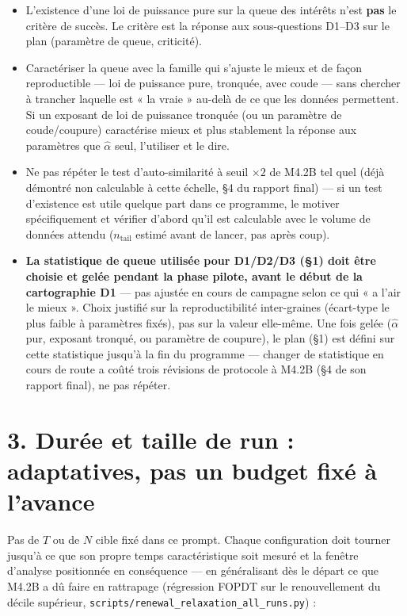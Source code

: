 \documentclass[11pt,a4paper]{article}
\newcommand{\code}[1]{\texttt{#1}}
\begin{document}
\begin{itemize}
\item L'existence d'une loi de puissance pure sur la queue des
  intérêts n'est \textbf{pas} le critère de succès. Le critère est la
  réponse aux sous-questions D1--D3 sur le plan (paramètre de queue,
  criticité).
\item Caractériser la queue avec la famille qui s'ajuste le mieux et
  de façon reproductible --- loi de puissance pure, tronquée, avec
  coude --- sans chercher à trancher laquelle est « la vraie »
  au-delà de ce que les données permettent. Si un exposant de loi de
  puissance tronquée (ou un paramètre de coude/coupure) caractérise
  mieux et plus stablement la réponse aux paramètres que $\hat\alpha$
  seul, l'utiliser et le dire.
\item Ne pas répéter le test d'auto-similarité à seuil $\times 2$ de
  M4.2B tel quel (déjà démontré non calculable à cette échelle, \S4 du
  rapport final) --- si un test d'existence est utile quelque part
  dans ce programme, le motiver spécifiquement et vérifier d'abord
  qu'il est calculable avec le volume de données attendu
  ($n_{\mathrm{tail}}$ estimé avant de lancer, pas après coup).
\item \textbf{La statistique de queue utilisée pour D1/D2/D3 (\S1)
  doit être choisie et gelée pendant la phase pilote, avant le début
  de la cartographie D1} --- pas ajustée en cours de campagne selon
  ce qui « a l'air le mieux ». Choix justifié sur la reproductibilité
  inter-graines (écart-type le plus faible à paramètres fixés), pas
  sur la valeur elle-même. Une fois gelée ($\hat\alpha$ pur, exposant
  tronqué, ou paramètre de coupure), le plan (\S1) est défini sur
  cette statistique jusqu'à la fin du programme --- changer de
  statistique en cours de route a coûté trois révisions de protocole
  à M4.2B (\S4 de son rapport final), ne pas répéter.
\end{itemize}

\section*{3. Durée et taille de run : adaptatives, pas un budget fixé à l'avance}

Pas de $T$ ou de $N$ cible fixé dans ce prompt. Chaque configuration
doit tourner jusqu'à ce que son propre temps caractéristique soit
mesuré et la fenêtre d'analyse positionnée en conséquence --- en
généralisant dès le départ ce que M4.2B a dû faire en rattrapage
(régression FOPDT sur le renouvellement du décile supérieur,
\code{scripts/renewal\_relaxation\_all\_runs.py}) :
\end{document}
